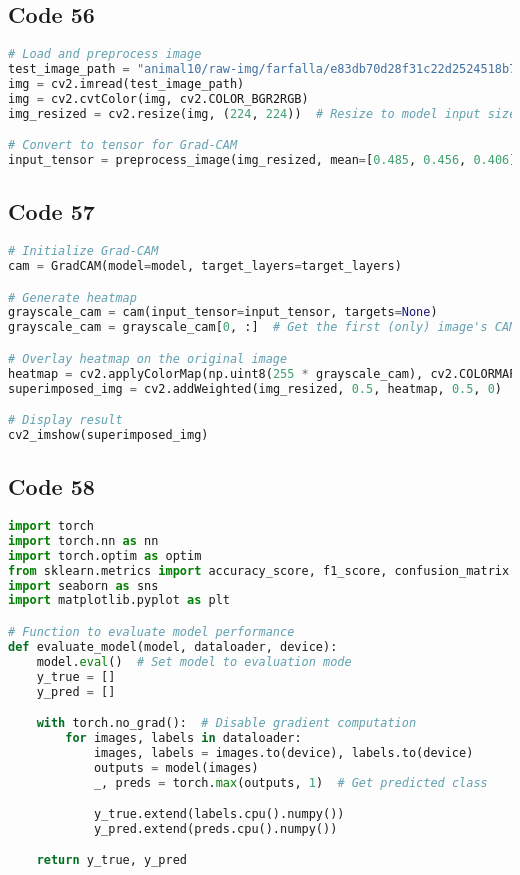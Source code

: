\documentclass{article}
\begin{document}
\subsection*{Code 56}
\begin{lstlisting}[language=Python]
# Load and preprocess image
test_image_path = "animal10/raw-img/farfalla/e83db70d28f31c22d2524518b7444f92e37fe5d404b0144390f8c770a2e9b5_640.jpg"  # Change path to an actual image
img = cv2.imread(test_image_path)
img = cv2.cvtColor(img, cv2.COLOR_BGR2RGB)
img_resized = cv2.resize(img, (224, 224))  # Resize to model input size

# Convert to tensor for Grad-CAM
input_tensor = preprocess_image(img_resized, mean=[0.485, 0.456, 0.406], std=[0.229, 0.224, 0.225])
\end{lstlisting}

\subsection*{Code 57}
\begin{lstlisting}[language=Python]
# Initialize Grad-CAM
cam = GradCAM(model=model, target_layers=target_layers)

# Generate heatmap
grayscale_cam = cam(input_tensor=input_tensor, targets=None)
grayscale_cam = grayscale_cam[0, :]  # Get the first (only) image's CAM

# Overlay heatmap on the original image
heatmap = cv2.applyColorMap(np.uint8(255 * grayscale_cam), cv2.COLORMAP_JET)
superimposed_img = cv2.addWeighted(img_resized, 0.5, heatmap, 0.5, 0)

# Display result
cv2_imshow(superimposed_img)
\end{lstlisting}

\subsection*{Code 58}
\begin{lstlisting}[language=Python]
import torch
import torch.nn as nn
import torch.optim as optim
from sklearn.metrics import accuracy_score, f1_score, confusion_matrix
import seaborn as sns
import matplotlib.pyplot as plt

# Function to evaluate model performance
def evaluate_model(model, dataloader, device):
    model.eval()  # Set model to evaluation mode
    y_true = []
    y_pred = []

    with torch.no_grad():  # Disable gradient computation
        for images, labels in dataloader:
            images, labels = images.to(device), labels.to(device)
            outputs = model(images)
            _, preds = torch.max(outputs, 1)  # Get predicted class

            y_true.extend(labels.cpu().numpy())
            y_pred.extend(preds.cpu().numpy())

    return y_true, y_pred

\end{lstlisting}
\end{document}
